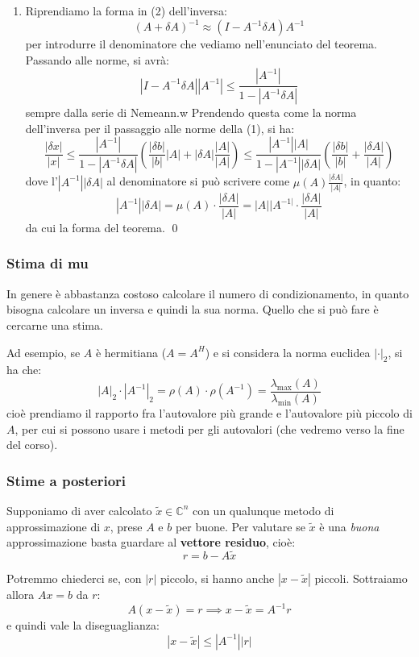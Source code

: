 \documentclass[a4paper,11pt]{article}
\begin{document}
\begin{enumerate}
\item 
Riprendiamo la forma in (2) dell'inversa:
$$
(A + \delta A)^{-1} \approx (I - A^{-1} \delta A ) A^{-1} 
$$
per introdurre il denominatore che vediamo nell'enunciato del teorema.
Passando alle norme, si avrà:
$$
|I - A^{-1} \delta A| |A^{-1}| \leq \frac{|A^{-1}|}{1 - |A^{-1} \delta A|}
$$
sempre dalla serie di Nemeann.w
Prendendo questa come la norma dell'inversa per il passaggio alle norme della (1), si ha:
$$
\frac{|\delta x|}{|x|} \leq \frac{|A^{-1}|}{1 - |A^{-1} \delta A|} \left( \frac{|\delta b|}{|b|} |A| + |\delta A| \frac{|A|}{|A|} \right) \leq \frac{ |A^{-1}| |A| }{ 1 - |A^{-1}| |\delta A| } \left( \frac{|\delta b|}{|b|} + \frac{|\delta A|}{|A|} \right)
$$
dove l'$|A^{-1}| |\delta A|$ al denominatore si può scrivere come $\mu(A) \frac{|\delta A|}{|A|}$, in quanto:
$$
|A^{-1}| |\delta A| = \mu(A) \cdot \frac{|\delta A|}{|A|} = |A||A^{-1|} \cdot \frac{|\delta A|}{|A|}
$$
da cui la forma del teorema. \qed
\end{enumerate}

\subsubsection{Stima di mu}
In genere è abbastanza costoso calcolare il numero di condizionamento, in quanto bisogna calcolare un inversa e quindi la sua norma.
Quello che si può fare è cercarne una stima.

Ad esempio, se $A$ è hermitiana ($A = A^H$) e si considera la norma euclidea $|\cdot|_2$, si ha che:
$$
|A|_2 \cdot |A^{-1}|_2 = \rho(A) \cdot \rho(A^{-1}) = \frac{\lambda_\text{max}(A)}{\lambda_\text{min}(A)}
$$
cioè prendiamo il rapporto fra l'autovalore più grande e l'autovalore più piccolo di $A$, per cui si possono usare i metodi per gli autovalori (che vedremo verso la fine del corso).

\subsubsection{Stime a posteriori}
Supponiamo di aver calcolato $\tilde{x} \in \mathbb{C}^n$ con un qualunque metodo di approssimazione di $x$, prese $A$ e $b$ per buone.
Per valutare se $\tilde{x}$ è una \textit{buona} approssimazione basta guardare al \textbf{vettore residuo}, cioè:
$$
r = b - A \tilde{x}
$$

Potremmo chiederci se, con $|r|$ piccolo, si hanno anche $|x - \tilde{x}|$ piccoli.
Sottraiamo allora $Ax = b$ da $r$:
$$
A \left( x - \tilde{x} \right) = r \implies x - \tilde{x} = A^{-1} r
$$
e quindi vale la diseguaglianza:
$$
|x - \tilde{x} | \leq |A^{-1}| |r|
$$
\end{document}
